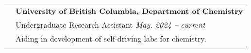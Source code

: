 \documentclass[letterpaper, 11pt]{article}
\begin{document}
\begin{longtable}{p{1.3in}p{4.8in}}
	\nohyphens{\color{Blue}{Research Experience}}
	 & \textbf{University of British Columbia, Department of Chemistry}                                                                                                                                                                                                                                                                                                                          \\
	 & Undergraduate Research Assistant \hfill \textit{May. 2024 --  current}                                                                                                                                                                                                                                                                                                                    \\
	 & Aiding in development of self-driving labs for chemistry.                                                                                                                                                                                                                                                                                                                                 \\
	 &                                                                                                                                                                                                                                                                                                                                                                                           \\


\end{longtable}
\end{document}
